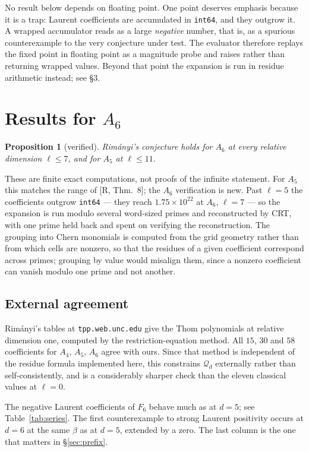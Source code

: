 \documentclass[11pt,a4paper]{article}
\newcommand{\Qd}{\mathcal{Q}}
\theoremstyle{plain}
\newtheorem{proposition}{Proposition}
\theoremstyle{definition}
\theoremstyle{remark}
\begin{document}
No result below depends on floating point. One point deserves emphasis because it is a trap:
Laurent coefficients are accumulated in \texttt{int64}, and they outgrow it. A wrapped
accumulator reads as a large \emph{negative} number, that is, as a spurious counterexample to
the very conjecture under test. The evaluator therefore replays the fixed point in floating
point as a magnitude probe and raises rather than returning wrapped values.  Beyond that point
the expansion is run in residue arithmetic instead; see \S3.

\section{Results for \texorpdfstring{$A_6$}{A\_6}}

\begin{proposition}[verified]
Rim\'anyi's conjecture holds for $A_6$ at every relative dimension $\ell \le 7$, and for $A_5$ at
$\ell \le 11$.
\end{proposition}

These are finite exact computations, not proofs of the infinite statement. For $A_5$ this matches
the range of [R, Thm.~8]; the $A_6$ verification is new. Past $\ell = 5$ the coefficients outgrow
\texttt{int64} --- they reach $1.75 \times 10^{22}$ at $A_6$, $\ell = 7$ --- so the expansion is
run modulo several word-sized primes and reconstructed by CRT, with one prime held back and spent
on verifying the reconstruction. The grouping into Chern monomials is computed from the grid
geometry rather than from which cells are nonzero, so that the residues of a given coefficient
correspond across primes; grouping by value would misalign them, since a nonzero coefficient can
vanish modulo one prime and not another.

\subsection{External agreement}

Rim\'anyi's tables at \texttt{tpp.web.unc.edu} give the Thom polynomials at relative dimension
one, computed by the restriction-equation method. All $15$, $30$ and $58$ coefficients for $A_4$,
$A_5$, $A_6$ agree with ours. Since that method is independent of the residue formula implemented
here, this constrains $\Qd_d$ externally rather than self-consistently, and is a considerably
sharper check than the eleven classical values at $\ell = 0$.

The negative Laurent coefficients of $F_6$ behave much as at $d = 5$; see
Table~\ref{tab:series}. The first counterexample to strong Laurent positivity occurs at $d = 6$
at the same $\beta$ as at $d = 5$, extended by a zero. The last column is the one that matters
in \S\ref{sec:prefix}.
\end{document}
